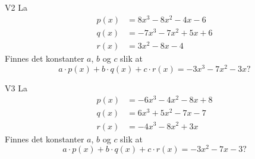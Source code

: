 \begin{oppgave}{V2}
La 
\begin{align*}
p(x)&=8x^3-8x^2-4x-6 \\
q(x)&=-7x^3-7x^2+5x+6 \\
r(x)&=3x^2-8x-4 
\end{align*}
Finnes det konstanter $a$, $b$ og $c$ slik at 
\[
a\cdot p(x)+b\cdot q(x)+c\cdot r(x)=-3x^3-7x^2-3x?
\]
\end{oppgave}

\begin{oppgave}{V3}
La 
\begin{align*}
p(x)&=-6x^3-4x^2-8x+8 \\
q(x)&=6x^3+5x^2-7x-7 \\
r(x)&=-4x^3-8x^2+3x
\end{align*}
Finnes det konstanter $a$, $b$ og $c$ slik at 
\[
a\cdot p(x)+b\cdot q(x)+c\cdot r(x)=-3x^2-7x-3?
\]
\end{oppgave}


